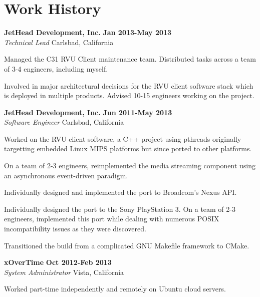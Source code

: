 \section{Work History}
\begin{lonelist}

\item[] \textbf{JetHead Development, Inc.} \hfill \textbf{Jan 2013-May 2013}\\
  \textit{Technical Lead} \hfill Carlsbad, California
  \begin{innerlist}
  \item Managed the C31 RVU Client maintenance team. Distributed tasks across a
      team of 3-4 engineers, including myself.

  \item Involved in major architectural decisions for the RVU client software
      stack which is deployed in multiple products. Advised 10-15 engineers
      working on the project.
  \end{innerlist}

\item[] \textbf{JetHead Development, Inc.} \hfill \textbf{Jun 2011-May 2013}\\
  \textit{Software Engineer} \hfill Carlsbad, California
  \begin{innerlist}
  \item Worked on the RVU client software, a C++ project using pthreads
      originally targetting embedded Linux MIPS platforms but since ported to
      other platforms.

  \item On a team of 2-3 engineers, reimplemented the media streaming component
      using an asynchronous event-driven paradigm.

  \item Individually designed and implemented the port to Broadcom's Nexus API.

  \item Individually designed the port to the Sony PlayStation 3. On a team
      of 2-3 engineers, implemented this port while dealing with numerous
      POSIX incompatibility issues as they were discovered.

  \item Transitioned the build from a complicated GNU Makefile framework to
      CMake.
  \end{innerlist}

\item[] \textbf{xOverTime} \hfill \textbf{Oct 2012-Feb 2013}\\
  \textit{System Administrator} \hfill Vista, California
  \begin{innerlist}
  \item Worked part-time independently and remotely on Ubuntu cloud servers.


\end{innerlist}
\end{lonelist}
